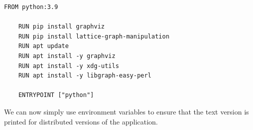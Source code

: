 \begin{lstlisting}[caption={The DockerFile used for distribution},captionpos=b,label={lst:dockerfile}]
    FROM python:3.9

    RUN pip install graphviz
    RUN pip install lattice-graph-manipulation
    RUN apt update
    RUN apt install -y graphviz
    RUN apt install -y xdg-utils
    RUN apt install -y libgraph-easy-perl

    ENTRYPOINT ["python"]
\end{lstlisting}

We can now simply use environment variables to ensure that the text version is printed for distributed versions of
the application.
